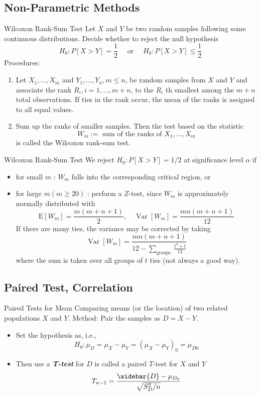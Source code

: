 \documentclass{beamer}
\newcommand{\bb}[1]{\textcolor{antiquefuchsia}{\textbf{\textit{#1}}}}
\begin{document}
\subsection{Non-Parametric Methods}
\begin{frame}{Wilcoxon Rank-Sum Test}
Let $X$ and $Y$ be two random samples following some continuous distributions.
Decide whether to reject the null hypothesis
$$
H_{0}: P[X>Y]=\frac{1}{2} \quad \text { or } \quad H_{0}: P[X>Y] \leq \frac{1}{2}
$$
Procedures:
\begin{enumerate}
\item Let $X_{1}, \ldots, X_{m}$ and $Y_{1}, \ldots, Y_{n}, m \leq n$, be random samples from $X$ and $Y$ and associate the rank $R_{i}, i=1, \ldots, m+n$, to the $R_{i}$ th smallest among the $m+n$ total observations. If ties in the rank occur, the mean of the ranks is assigned to all equal values.
\item Sum up the ranks of smaller samples. Then the test based on the statistic
$$
W_{m}:=\text { sum of the ranks of } X_{1}, \ldots, X_{m}
$$
is called the Wilcoxon rank-sum test.
\end{enumerate}
\end{frame}

\begin{frame}{Wilcoxon Rank-Sum Test}
We reject $H_{0}: P[X>Y]=1 / 2$ at significance level $\alpha$ if
\begin{itemize}
\item for small $m$ : $W_{m}$ falls into the corresponding critical region, or
\item for large $m(m \geq 20)$ : perform a $Z$-test, since $W_{m}$ is approximately normally distributed with
$$
\mathrm{E}\left[W_{m}\right]=\frac{m(m+n+1)}{2}, \quad \operatorname{Var}\left[W_{m}\right]=\frac{m n(m+n+1)}{12}
$$
If there are many ties, the variance may be corrected by taking
$$
\operatorname{Var}\left[W_{m}\right]=\frac{m n(m+n+1)}{12-\sum_{\text {groups }} \frac{t^{3}+t}{12}}
$$
where the sum is taken over all groups of $t$ ties (not always a good way).
\end{itemize}
\end{frame}

\subsection{Paired Test, Correlation}
\begin{frame}{Paired Tests for Mean}
Comparing means (or the location) of two related populations $X$ and $Y$.
Method: Pair the samples as $D=X-Y$.
\begin{itemize}
\item Set the hypothesis as, i.e.,
$$
H_{0}: \mu_{D}=\mu_{X}-\mu_{Y}=\left(\mu_{X}-\mu_{Y}\right)_{0}=\mu_{D 0}
$$
\item Then use a \bb{T-test} for $D$ is called a paired $T$-test for $X$ and $Y$
$$
T_{n-1}=\frac{\widebar{D}-\mu_{D_{0}}}{\sqrt{S_{D}^{2} / n}}
$$
\end{itemize}
\end{frame}
\end{document}
